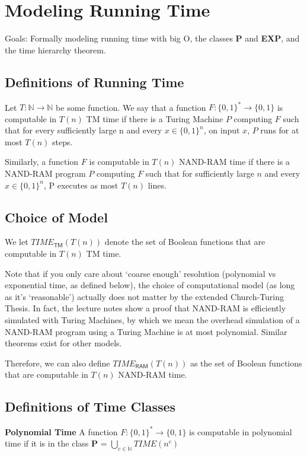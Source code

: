 \documentclass[11pt]{article}
\theoremstyle{definition}
\theoremstyle{remark}
\begin{document}
\section{Modeling Running Time}

Goals: Formally modeling running time with big O, the classes \textbf{P} and \textbf{EXP}, and the time hierarchy theorem.

\subsection{Definitions of Running Time} Let $T: \mathbb{N} \rightarrow \mathbb{N}$ be some function. We say that a function $F: \{0, 1\}^* \rightarrow \{0,1\}$ is computable in $T(n)$ TM time if there is a Turing Machine $P$ computing $F$ such that for every sufficiently large n and every $x \in \{0, 1 \}^n$, on input $x$, $P$ runs for at most $T(n)$ steps.

Similarly, a function $F$ is computable in $T(n)$ NAND-RAM time if there is a NAND-RAM program $P$ computing $F$ such that for sufficiently large $n$ and every $x \in \{0, 1\}^n$, P executes as most $T(n)$ lines.

\subsection{Choice of Model}
We let  $TIME_{\mathsf{TM}}(T(n))$ denote the set of Boolean functions that are computable in $T(n)$ TM time.

Note that if you only care about `coarse enough' resolution (polynomial vs exponential time, as defined below), the choice of computational model (as long as it's `reasonable') actually does not matter by the extended Church-Turing Thesis.
In fact, the lecture notes show a proof that NAND-RAM is efficiently simulated with Turing Machines, by which we mean the overhead simulation of a NAND-RAM program using a Turing Machine is at most polynomial.
Similar theorems exist for other models.

Therefore, we can also define $TIME_\mathsf{RAM} (T(n))$ as the set of Boolean functions that are computable in $T(n)$ NAND-RAM time.



\subsection{Definitions of Time Classes}
\textbf{Polynomial Time} A function $F:\{0,1\}^* \rightarrow \{0,1 \}$ is computable in polynomial time if it is in the class \textbf{P} = $\bigcup_{c \in \mathbb{N}} TIME(n^c)$
\end{document}
